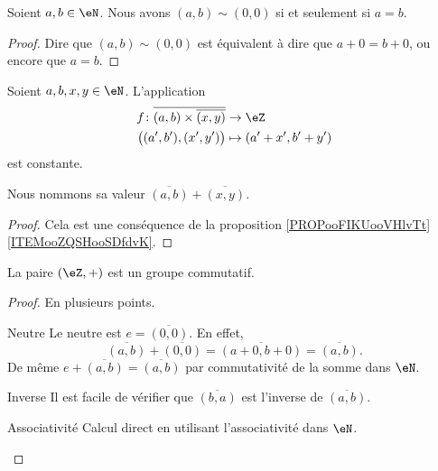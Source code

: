 \begin{lemma}
	Soient \( a,b\in \eN\). Nous avons \( (a,b)\sim (0,0)\) si et seulement si \( a=b\).
\end{lemma}

\begin{proof}
	Dire que \( (a,b)\sim (0,0)\) est équivalent à dire que \( a+0=b+0\), ou encore que \( a=b\).
\end{proof}

\begin{propositionDef}
	Soient \( a,b,x,y\in \eN\). L'application
	\begin{equation}
		\begin{aligned}
			f\colon \overline{ (a,b)\times \overline{ (x,y) } } & \to \eZ               \\
			\big( (a',b'),(x',y') \big)                         & \mapsto (a'+x',b'+y')
		\end{aligned}
	\end{equation}
	est constante.

	Nous nommons sa valeur \( \overline{ (a,b) }+\overline{ (x,y) }\).
\end{propositionDef}

\begin{proof}
	Cela est une conséquence de la proposition \ref{PROPooFIKUooVHlvTt}\ref{ITEMooZQSHooSDfdvK}.
\end{proof}

\begin{proposition}
	La paire \( (\eZ,+)\) est un groupe commutatif.
\end{proposition}

\begin{proof}
	En plusieurs points.
	\begin{subproof}
		\item[Neutre]
		Le neutre est \( e=\overline{ (0,0) }\). En effet,
		\begin{equation}
			\overline{ (a,b) }+\overline{ (0,0) }=\overline{ (a+0,b+0) }=\overline{ (a,b) }.
		\end{equation}
		De même \( e+\overline{ (a,b) }=\overline{ (a,b) }\) par commutativité de la somme dans \( \eN\).
		\item[Inverse]
		Il est facile de vérifier que \( \overline{ (b,a) }\) est l'inverse de \( \overline{ (a,b) }\).
		\item[Associativité]
		Calcul direct en utilisant l'associativité dans \( \eN\).
	\end{subproof}
\end{proof}

